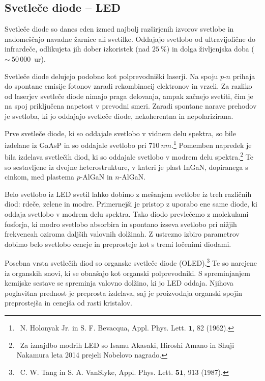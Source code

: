 \subsection{Svetleče diode -- LED}
Svetleče diode so danes eden izmed najbolj razširjenih izvorov svetlobe in nadomeščajo
navadne žarnice ali svetilke. Oddajajo svetlobo od ultravijolične do infrardeče, 
odlikujeta jih 
dober izkoristek (nad $25~\%$) in dolga življenjska doba ($\sim~50\,000$~ur).

Svetleče diode delujejo podobno kot polprevodniški laserji. Na spoju $p$-$n$ prihaja do 
spontane emisije fotonov zaradi rekombinacij elektronov in vrzeli. Za razliko od laserjev 
svetleče diode nimajo praga delovanja, ampak začnejo svetiti, čim je na spoj priključena 
napetost v prevodni smeri. Zaradi spontane narave prehodov je svetloba, ki jo oddajajo
svetleče diode, nekoherentna in nepolarizirana. 

Prve svetleče diode, ki so oddajale svetlobo v vidnem delu spektra,
so bile izdelane iz GaAsP in so oddajale 
svetlobo pri $710~\si{nm}$.\footnote{~N. Holonyak Jr. in S. F. Bevacqua, Appl. Phys. Lett.
${\mathbf 1}$, 82 (1962).} Pomemben
napredek je bila izdelava svetlečih diod, ki so oddajale svetlobo v modrem delu 
spektra.\footnote{~Za iznajdbo modrih LED so Isamu Akasaki, Hiroshi Amano in 
Shuji Nakamura leta 2014 prejeli Nobelovo nagrado.} Te so sestavljene iz dvojne
heterostrukture, v kateri je plast InGaN, dopiranega s cinkom, 
med plastema $p$-AlGaN in $n$-AlGaN.

Belo svetlobo iz LED svetil lahko dobimo z mešanjem svetlobe iz treh različnih 
diod: rdeče, zelene in modre. Primernejši je pristop z uporabo ene same diode, 
ki oddaja svetlobo v modrem delu spektra. Tako diodo prevlečemo z 
molekulami fosforja, ki
modro svetlobo absorbira in spontano izseva svetlobo pri nižjih frekvencah 
oziroma daljših valovnih dolžinah. Z ustrezno izbiro parametrov dobimo belo svetlobo
ceneje in preprosteje kot s tremi ločenimi diodami. 

\begin{remark}
Posebna vrsta svetlečih diod so organske svetleče diode (OLED).\footnote{~C. W. Tang in
S. A. VanSlyke, Appl. Phys. Lett. $\mathbf{51}$, 913 (1987).} Te so narejene iz
organskih snovi, ki se obnašajo kot organski polprevodniki. S spreminjanjem kemijske
sestave se spreminja valovno dolžino, ki jo LED oddaja. Njihova poglavitna prednost
je preprosta izdelava, saj je proizvodnja organski spojin preprostejša in cenejša
od rasti kristalov. 
\end{remark}
